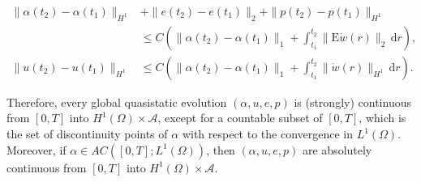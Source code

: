 \documentclass[10pt,a4paper]{amsart}
\def\EE {\mathrm{E}}
\def\de {\mathrm{d}}
\begin{document}
\begin{align}
\|\alpha(t_2)-\alpha(t_1)\|_{H^1}&+\|e(t_2)-e(t_1)\|_2+\|p(t_2)-p(t_1)\|_{H^1}\nonumber\\
&\le C\left(\|\alpha(t_2)-\alpha(t_1)\|_1+\int_{t_1}^{t_2}\|\EE \dot w(r)\|_2\,\de r\right),\label{eq:cont1}\\
\|u(t_2)-u(t_1)\|_{H^1}&\le C\left(\|\alpha(t_2)-\alpha(t_1)\|_1+\int_{t_1}^{t_2}\|\dot w(r)\|_{H^1}\,\de r\right).\label{eq:cont2}
\end{align}

\begin{remark}
Therefore, every global quasistatic evolution $(\alpha,u,e,p)$ is (strongly) continuous from $[0,T]$ into $H^1(\Omega)\times\mathcal A$, except for a countable subset of $[0,T]$, which is the set of discontinuity points of $\alpha$ with respect to the convergence in $L^1(\Omega)$. Moreover, if $\alpha\in AC([0,T];L^1(\Omega))$, then $(\alpha,u,e,p)$ are absolutely continuous from $[0,T]$ into $H^1(\Omega)\times \mathcal A$.
\end{remark}
\end{document}
